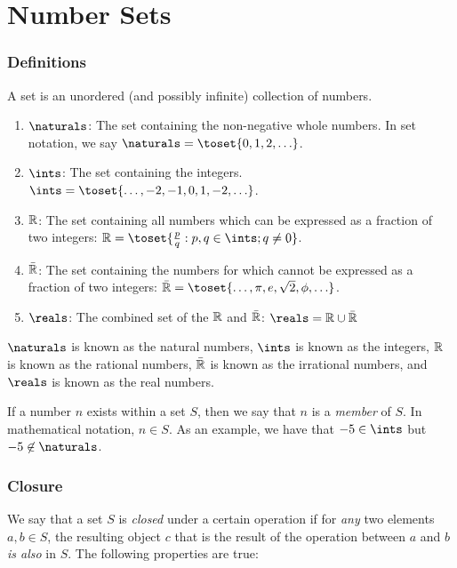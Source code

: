 \documentclass[../proofs.tex]{subfiles}
\begin{document}
\section{Number Sets}
  \subsubsection{Definitions}
  A set is an unordered (and possibly infinite) collection of numbers.
  \begin{enumerate}
    \item $\naturals$: The set containing the non-negative whole numbers. In
    set notation, we say $\naturals = \toset{0, 1, 2, \ldots}$.

    \item $\ints$: The set containing the integers. $\ints = \toset{\ldots, -2,
    -1, 0, 1, -2, \ldots}$.

    \item $\mathbb{R}$: The set containing all numbers which can be expressed as
    a fraction of two integers:
    $\rationals = \toset{\frac{p}{q}: p, q \in \ints; q \neq 0}$.

    \item $\bar{\mathbb{R}}$: The set containing the numbers for which cannot
    be expressed as a fraction of two integers:
    $\bar{\rationals} = \toset{\ldots, \pi, e, \sqrt{2}, \phi, \ldots}$.

    \item $\reals$: The combined set of the $\mathbb{R}$ and $\bar{\mathbb{R}}$:
    $\reals = \rationals \cup \bar{\rationals}$
  \end{enumerate}

  $\naturals$ is known as the natural numbers, $\ints$ is known as the integers,
  $\mathbb{R}$ is known as the rational numbers, $\bar{\mathbb{R}}$ is known as
  the irrational numbers, and $\reals$ is known as the real numbers.

  If a number $n$ exists within a set $S$, then we say that $n$ is a
  \emph{member} of $S$. In mathematical notation, $n \in S$. As an example, we
  have that $-5 \in \ints$ but $-5 \not\in \naturals$.

  \subsubsection{Closure}
  We say that a set $S$ is \emph{closed} under a certain operation if for
  \emph{any} two elements $a, b \in S$, the resulting object $c$ that is the
  result of the operation between $a$ and $b$ \emph{is also} in $S$. The
  following properties are true:
\end{document}
